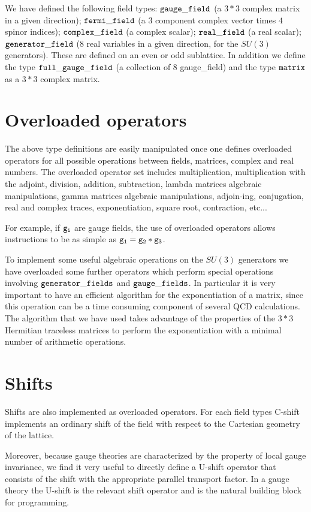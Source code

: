 We have defined the following field types: 
$\tt gauge\_field$ (a $3*3$ complex matrix in a given direction);
$\tt fermi\_field$ (a $3$ component complex vector times $4$ 
spinor indices);
$\tt complex\_field$ (a complex scalar);
$\tt real\_field$ (a real scalar);
$\tt generator\_field$ ($8$ real variables in a given direction, 
for the $SU(3)$ generators).
These are defined on an even or odd sublattice. 
In addition we define the type
$\tt full\_gauge\_field$ (a collection of $8$ gauge\_field) and
the type $\tt matrix $ as a $3*3$ complex matrix.


\section{Overloaded operators}

The above type definitions are easily manipulated once one
defines overloaded operators for all possible operations 
between fields, matrices, complex and real numbers. 
The overloaded operator set includes multiplication, 
multiplication with the adjoint, division,
addition, subtraction, lambda matrices algebraic manipulations,
gamma matrices algebraic manipulations, adjoin-ing, conjugation,
real and complex traces, exponentiation, square root, contraction, 
etc...

For example, if $\tt g_i$ are gauge fields, the use of 
overloaded operators allows instructions to be as
simple as $\tt g_1=g_2*g_3$.

To implement some useful algebraic operations
on the $SU(3)$ generators we have overloaded some further operators 
which perform special operations involving 
$\tt generator\_fields$ and $\tt gauge\_fields$.  
In particular it is very important to have an efficient algorithm 
for the exponentiation of a matrix, since this operation can be a time
consuming component of several QCD calculations. The algorithm
that we have used takes advantage of the properties of the $3*3$
Hermitian traceless matrices to perform the exponentiation
with a minimal number of arithmetic operations.


\section{Shifts}

Shifts are also implemented as overloaded operators. 
For each field types C-shift implements an ordinary shift 
of the field with respect to the Cartesian geometry of the lattice.  

Moreover, because gauge theories are characterized by the
property of local gauge invariance, we find it very useful to
directly define a U-shift operator that consists of the 
shift with the appropriate parallel transport factor.
In a gauge theory the U-shift is the relevant shift operator
and is the natural building block for programming.

